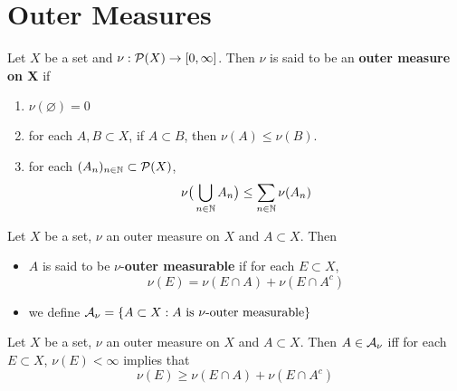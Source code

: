 \documentclass{book}
\begin{document}
	
	
	
	
	
	
	
	
	
	
	
	
	
	
	
	
	\newpage
	\section{Outer Measures}
	
	\begin{defn}  
		Let $X$ be a set and $\nu : \mathcal{P}(X) \rightarrow [0, \infty]$. Then $\nu$ is said to be an \textbf{outer measure on X} if 
		\begin{enumerate}
			\item $\nu(\varnothing) = 0$
			\item for each $A,B \subset X $, if $A \subset B$, then $\nu(A) \leq \nu(B)$.
			\item for each $(A_n)_{n \in \mathbb{N}} \subset \mathcal{P}(X)$, $$\nu\big(\bigcup\limits_{n \in \mathbb{N}} A_n\big) \leq \sum\limits_{n \in \mathbb{N}}\nu(A_n) $$
		\end{enumerate}
	\end{defn}
	
	\begin{defn}  
		Let $X$ be a set, $\nu$ an outer measure on $X$ and $A \subset X$. Then 
		\begin{itemize}
			\item $A$ is said to be $\nu$-\textbf{outer measurable} if for each $E \subset X$, 
			\begin{equation*}
				\nu(E) = \nu(E \cap A) + \nu(E \cap A^c)
			\end{equation*}
			\item we define $\mathcal{A}_{\nu} = \{A \subset X: A \text{ is }\nu \text{-outer measurable}\}$
		\end{itemize}
	\end{defn}
	
	\begin{ex}  
	Let $X$ be a set, $\nu$ an outer measure on $X$ and $A \subset X$. Then $A \in \mathcal{A}_{\nu}$ iff for each $E \subset X$, $\nu(E) < \infty$ implies that 
	\begin{equation*}
	\nu(E) \geq \nu(E \cap A) + \nu(E \cap A^c)
	\end{equation*}
	\end{ex}	
	
\end{document}
